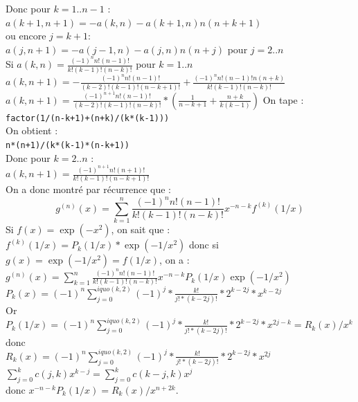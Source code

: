 \documentclass[a4paper,11pt]{book}
\begin{document}
Donc pour $k=1..n-1$ :\\
$a(k+1,n+1)=-a(k,n)-a(k+1,n)n(n+k+1)$\\
ou encore $j=k+1$:\\
$a(j,n+1)=-a(j-1,n)-a(j,n)n(n+j)$ pour $j=2..n$\\
Si $a(k,n)=\frac{(-1)^nn!(n-1)!}{k!(k-1)!(n-k)!}$ pour $k=1..n$\\
$a(k,n+1)=-\frac{(-1)^nn!(n-1)!}{(k-2)!(k-1)!(n-k+1)!}+\frac{(-1)^nn!(n-1)!n(n+k)}{k!(k-1)!(n-k)!}$
$a(k,n+1)=\frac{(-1)^{n+1}n!(n-1)!}{(k-2)!(k-1)!(n-k)!}*(\frac{1}{n-k+1}+\frac{n+k}{k(k-1)})$
On tape :\\
{\tt factor(1/(n-k+1)+(n+k)/(k*(k-1)))}\\
On obtient :\\
{\tt n*(n+1)/(k*(k-1)*(n-k+1))}\\
Donc pour $k=2..n$ :\\
$a(k,n+1)=\frac{(-1)^{n+1}n!(n+1)!}{k!(k-1)!(n-k+1)!}$\\
On a donc montr\'e par r\'ecurrence que :\\
$$g^(n)(x)=\sum_{k=1}^n\frac{(-1)^nn!(n-1)!}{k!(k-1)!(n-k)!}x^{-n-k}f^{(k)}(1/x)$$
Si $f(x)=\exp(-x^2)$, on sait que :\\
$f^{(k)}(1/x)=P_k(1/x)*\exp(-1/x^2)$
donc si $g(x)=\exp(-1/x^2)=f(1/x)$, on a :\\
$g^(n)(x)=\sum_{k=1}^n\frac{(-1)^nn!(n-1)!}{k!(k-1)!(n-k)!}x^{-n-k}P_k(1/x)\exp(-1/x^2)$\\
$P_k(x)=(-1)^n\sum_{j=0}^{iquo(k,2)}(-1)^{j}*\frac{k!}{j!*(k-2j)!}*2^{k-2j}*x^{k-2j}$\\
Or $P_k(1/x)=(-1)^n\sum_{j=0}^{iquo(k,2)}(-1)^{j}*\frac{k!}{j!*(k-2j)!}*2^{k-2j}*x^{2j-k}= R_k(x)/x^k$ donc\\
$R_k(x)=(-1)^n\sum_{j=0}^{iquo(k,2)}(-1)^{j}*\frac{k!}{j!*(k-2j)!}*2^{k-2j}*x^{2j}$
\\
$\sum_{j=0}^kc(j,k)x^{k-j}=\sum_{j=0}^kc(k-j,k)x^{j}$\\
donc $x^{-n-k}P_k(1/x)= R_k(x)/x^{n+2k}$.\\
\end{document}
